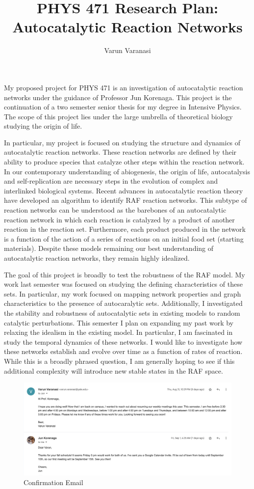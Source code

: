 \documentclass{article}
\title{PHYS 471 Research Plan: Autocatalytic Reaction Networks}
\author{Varun Varanasi}
\begin{document}
\maketitle

My proposed project for PHYS 471 is an investigation of autocatalytic reaction networks under the guidance of Professor Jun Korenaga.
This project is the continuation of a two semester senior thesis for my degree in Intensive Physics. The scope of this project lies under the large umbrella of theoretical biology studying the origin of life. 

In particular, my project is focused on studying the structure and dynamics of autocatalytic reaction networks. These reaction networks are defined by their ability to produce species that catalyze other steps within the reaction network. In our contemporary understanding of abiogenesis, the origin of life, autocatalysis and self-replication are necessary steps in the evolution of complex and interlinked biological systems. Recent advances in autocatalytic reaction theory have developed an algorithm to identify RAF reaction networks. This subtype of reaction networks can be understood as the barebones of an autocatalytic reaction network in which each reaction is catalyzed by a product of another reaction in the reaction set. Furthermore, each product produced in the network is a function of the action of a series of reactions on an initial food set (starting materials). Despite these models remaining our best understanding of autocatalytic reaction networks, they remain highly idealized. 

The goal of this project is broadly to test the robustness of the RAF model.
My work last semester was focused on studying the defining characteristics of these sets.
In particular, my work focused on mapping network properties and graph characteristics to the presence of autocaralytic sets. 
Additionally, I investigated the stability and robustness of autocatalytic sets in existing models to random catalytic perturbations. 
This semester I plan on expanding my past work by relaxing the idealism in the existing model. 
In particular, I am fascinated in study the temporal dynamics of these networks. 
I would like to investigate how these networks establish and evolve over time as a function of rates of reaction.
While this is a broadly phrased question, I am generally hoping to see if this additional complexity will introduce new stable states in the RAF space. 

\begin{figure}[H]
    \centering
    \includegraphics[width=15cm]{confirmation}
    \caption{Confirmation Email}
\end{figure}
\end{document}
